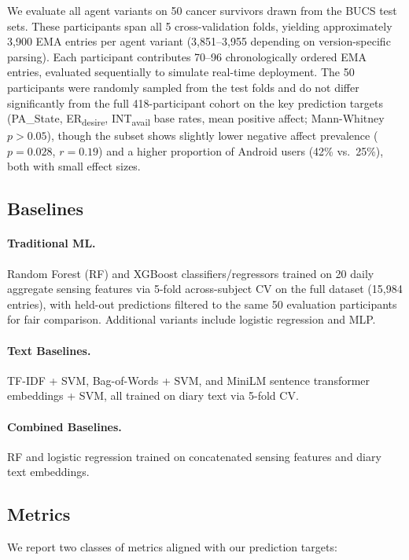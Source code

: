 \documentclass[screen,review,anonymous]{acmart}
\newcommand{\erdesire}{ER\textsubscript{desire}}
\newcommand{\intavail}{INT\textsubscript{avail}}
\begin{document}
We evaluate all agent variants on 50 cancer survivors drawn from the BUCS test sets. These participants span all 5 cross-validation folds, yielding approximately 3,900 EMA entries per agent variant (3,851--3,955 depending on version-specific parsing). Each participant contributes 70--96 chronologically ordered EMA entries, evaluated sequentially to simulate real-time deployment. The 50 participants were randomly sampled from the test folds and do not differ significantly from the full 418-participant cohort on the key prediction targets (PA\_State, \erdesire{}, \intavail{} base rates, mean positive affect; Mann-Whitney $p > 0.05$), though the subset shows slightly lower negative affect prevalence ($p = 0.028$, $r = 0.19$) and a higher proportion of Android users (42\% vs.\ 25\%), both with small effect sizes.

\subsection{Baselines}

\paragraph{Traditional ML.}
Random Forest (RF) and XGBoost classifiers/regressors trained on 20 daily aggregate sensing features via 5-fold across-subject CV on the full dataset (15,984 entries), with held-out predictions filtered to the same 50 evaluation participants for fair comparison. Additional variants include logistic regression and MLP.

\paragraph{Text Baselines.}
TF-IDF + SVM, Bag-of-Words + SVM, and MiniLM sentence transformer embeddings + SVM, all trained on diary text via 5-fold CV.

\paragraph{Combined Baselines.}
RF and logistic regression trained on concatenated sensing features and diary text embeddings.

\subsection{Metrics}

We report two classes of metrics aligned with our prediction targets:
\end{document}
